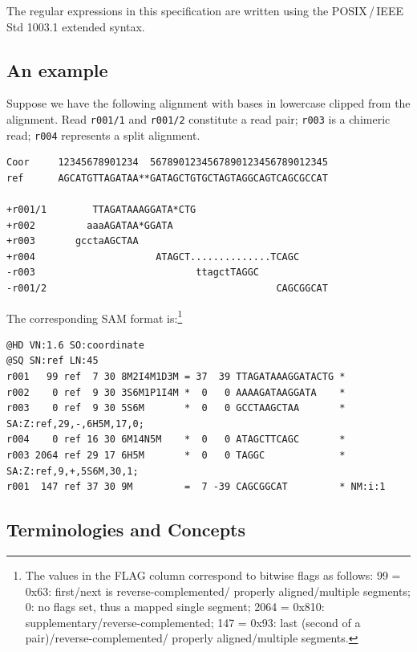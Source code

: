 \documentclass[10pt]{article}
\begin{document}
The regular expressions in this specification are written using the POSIX\,/\,IEEE Std 1003.1 extended syntax.

\subsection{An example}\label{sec:example}
Suppose we have the following alignment with bases in lowercase
clipped from the alignment. Read {\tt r001/1} and {\tt r001/2}
constitute a read pair; {\tt r003} is a chimeric read; {\tt r004}
represents a split alignment.

\begin{framed}\small
\begin{verbatim}
Coor     12345678901234  5678901234567890123456789012345
ref      AGCATGTTAGATAA**GATAGCTGTGCTAGTAGGCAGTCAGCGCCAT

+r001/1        TTAGATAAAGGATA*CTG
+r002         aaaAGATAA*GGATA
+r003       gcctaAGCTAA
+r004                     ATAGCT..............TCAGC
-r003                            ttagctTAGGC
-r001/2                                        CAGCGGCAT
\end{verbatim}
\end{framed}
The corresponding SAM format is:\footnote{The values in the
{\sf FLAG} column correspond to bitwise flags as follows:
99 = 0x63: first\slash next is reverse-complemented\slash
properly aligned\slash multiple segments;
0: no flags set, thus a mapped single segment;
2064 = 0x810: supplementary\slash reverse-complemented;
147 = 0x93: last (second of a pair)\slash reverse-complemented\slash
properly aligned\slash multiple segments.}
\begin{framed}\small
\begin{verbatim}
@HD VN:1.6 SO:coordinate
@SQ SN:ref LN:45
r001   99 ref  7 30 8M2I4M1D3M = 37  39 TTAGATAAAGGATACTG *
r002    0 ref  9 30 3S6M1P1I4M *  0   0 AAAAGATAAGGATA    *
r003    0 ref  9 30 5S6M       *  0   0 GCCTAAGCTAA       * SA:Z:ref,29,-,6H5M,17,0;
r004    0 ref 16 30 6M14N5M    *  0   0 ATAGCTTCAGC       *
r003 2064 ref 29 17 6H5M       *  0   0 TAGGC             * SA:Z:ref,9,+,5S6M,30,1;
r001  147 ref 37 30 9M         =  7 -39 CAGCGGCAT         * NM:i:1
\end{verbatim}
\end{framed}

\subsection{Terminologies and Concepts}
\end{document}
